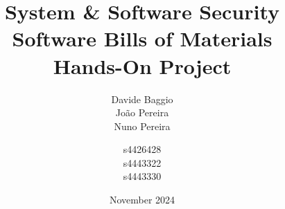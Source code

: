 \documentclass[12pt]{article}
\title{\textbf{System \& Software Security \\ Software Bills of Materials \\ Hands-On Project}}
\author{
    Davide Baggio \\ João Pereira \\ Nuno Pereira \and 
    s4426428      \\ s4443322     \\ s4443330 
}
\date{November 2024}
\begin{document}
\begin{titlepage}
    \maketitle
    \thispagestyle{empty}

    \vfill

    \tableofcontents

    \vfill

    
\end{titlepage}






\newpage
\printbibliography
\end{document}
